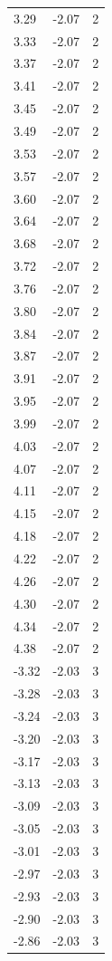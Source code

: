 \begin{longtable}{lrr}
  3.29 & -2.07 & 2 \\
  3.33 & -2.07 & 2 \\
  3.37 & -2.07 & 2 \\
  3.41 & -2.07 & 2 \\
  3.45 & -2.07 & 2 \\
  3.49 & -2.07 & 2 \\
  3.53 & -2.07 & 2 \\
  3.57 & -2.07 & 2 \\
  3.60 & -2.07 & 2 \\
  3.64 & -2.07 & 2 \\
  3.68 & -2.07 & 2 \\
  3.72 & -2.07 & 2 \\
  3.76 & -2.07 & 2 \\
  3.80 & -2.07 & 2 \\
  3.84 & -2.07 & 2 \\
  3.87 & -2.07 & 2 \\
  3.91 & -2.07 & 2 \\
  3.95 & -2.07 & 2 \\
  3.99 & -2.07 & 2 \\
  4.03 & -2.07 & 2 \\
  4.07 & -2.07 & 2 \\
  4.11 & -2.07 & 2 \\
  4.15 & -2.07 & 2 \\
  4.18 & -2.07 & 2 \\
  4.22 & -2.07 & 2 \\
  4.26 & -2.07 & 2 \\
  4.30 & -2.07 & 2 \\
  4.34 & -2.07 & 2 \\
  4.38 & -2.07 & 2 \\
  -3.32 & -2.03 & 3 \\
  -3.28 & -2.03 & 3 \\
  -3.24 & -2.03 & 3 \\
  -3.20 & -2.03 & 3 \\
  -3.17 & -2.03 & 3 \\
  -3.13 & -2.03 & 3 \\
  -3.09 & -2.03 & 3 \\
  -3.05 & -2.03 & 3 \\
  -3.01 & -2.03 & 3 \\
  -2.97 & -2.03 & 3 \\
  -2.93 & -2.03 & 3 \\
  -2.90 & -2.03 & 3 \\
  -2.86 & -2.03 & 3 \\

\end{longtable}
